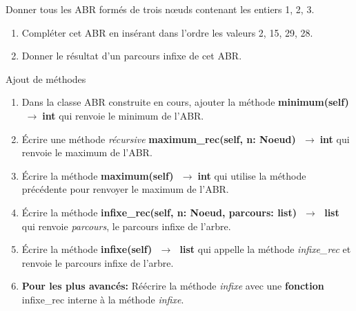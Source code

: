 \documentclass[a4paper,11pt]{article}
\begin{document}
\begin{exo}
Donner tous les ABR formés de trois nœuds contenant les entiers 1, 2, 3.
\end{exo}
\begin{exo}
    \begin{center}
        \label{arbre}
    \end{center}
    \begin{enumerate}
        \item Compléter cet ABR en insérant dans l'ordre les valeurs 2, 15, 29, 28.
        \item Donner le résultat d'un parcours infixe de cet ABR.
    \end{enumerate}
\end{exo}
\begin{exo} Ajout de méthodes
\begin{enumerate}
    \item Dans la classe ABR construite en cours, ajouter la méthode \textbf{minimum(self) $\;\rightarrow\;$int} qui renvoie le minimum de l'ABR.
    \item Écrire une méthode \emph{récursive} \textbf{maximum\_rec(self, n: Noeud) $\;\rightarrow\;$int} qui renvoie le maximum de l'ABR.
    \item Écrire la méthode \textbf{maximum(self) $\;\rightarrow\;$int} qui utilise la méthode précédente pour renvoyer le maximum de l'ABR.
    \item Écrire la méthode \textbf{infixe\_rec(self, n: Noeud, parcours: list) $\;\rightarrow\;$ list
    } qui renvoie \emph{parcours}, le parcours infixe de l'arbre.
    
    \item Écrire la méthode \textbf{infixe(self) $\;\rightarrow\;$ list} qui appelle la méthode \emph{infixe\_rec} et renvoie le parcours infixe de l'arbre.
    \item \textbf{Pour les plus avancés:} Réécrire la méthode \emph{infixe} avec une \textbf{fonction}  infixe\_rec interne à la méthode \emph{infixe}.
\end{enumerate}
\end{exo}
\end{document}
